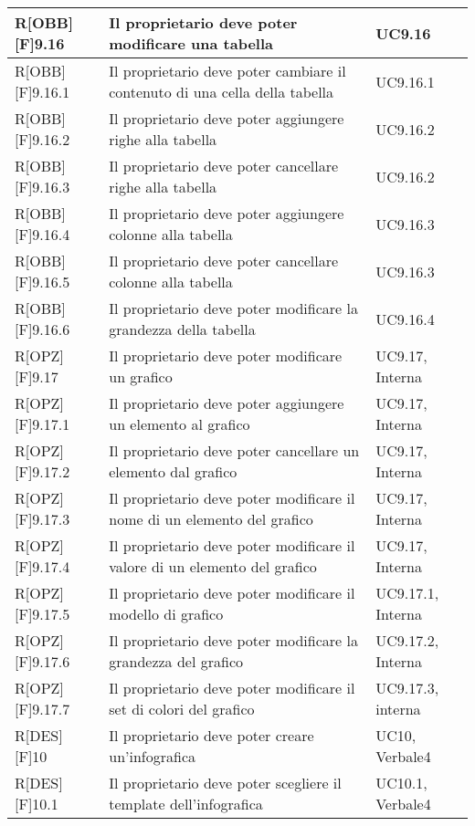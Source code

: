 	\begin{table}[h]
		\begin{tabular}{|p{}|p{}|p{}|}
			\midrule
			
R[OBB][F]9.16 & Il proprietario deve poter modificare una tabella & UC9.16 \\ \midrule
R[OBB][F]9.16.1 & Il proprietario deve poter cambiare il contenuto di una cella della tabella & UC9.16.1 \\ \midrule
R[OBB][F]9.16.2 & Il proprietario deve poter aggiungere righe alla tabella & UC9.16.2 \\ \midrule
R[OBB][F]9.16.3 & Il proprietario deve poter cancellare righe alla tabella & UC9.16.2 \\ \midrule
R[OBB][F]9.16.4 & Il proprietario deve poter aggiungere colonne alla tabella & UC9.16.3 \\ \midrule
R[OBB][F]9.16.5 & Il proprietario deve poter cancellare colonne alla tabella & UC9.16.3 \\ \midrule
R[OBB][F]9.16.6 & Il proprietario deve poter modificare la grandezza della tabella & UC9.16.4 \\ \midrule
R[OPZ][F]9.17 & Il proprietario deve poter modificare un grafico & UC9.17, Interna \\ \midrule
R[OPZ][F]9.17.1 & Il proprietario deve poter aggiungere un elemento al grafico & UC9.17, Interna \\ \midrule
R[OPZ][F]9.17.2 & Il proprietario deve poter cancellare un elemento dal grafico & UC9.17, Interna \\ \midrule
R[OPZ][F]9.17.3 & Il proprietario deve poter modificare il nome di un elemento del grafico & UC9.17, Interna \\ \midrule
R[OPZ][F]9.17.4 & Il proprietario deve poter modificare il valore di un elemento del grafico & UC9.17, Interna \\ \midrule
R[OPZ][F]9.17.5 & Il proprietario deve poter modificare il modello di grafico & UC9.17.1, Interna \\ \midrule
R[OPZ][F]9.17.6 & Il proprietario deve poter modificare la grandezza del grafico & UC9.17.2, Interna \\ \midrule
R[OPZ][F]9.17.7 & Il proprietario deve poter modificare il set di colori del grafico & UC9.17.3, interna \\ \midrule
R[DES][F]10 & Il proprietario deve poter creare un'infografica & UC10, Verbale4 \\ \midrule
R[DES][F]10.1 & Il proprietario deve poter scegliere il template dell'infografica & UC10.1, Verbale4 \\ \midrule

\end{tabular}
\end{table}
